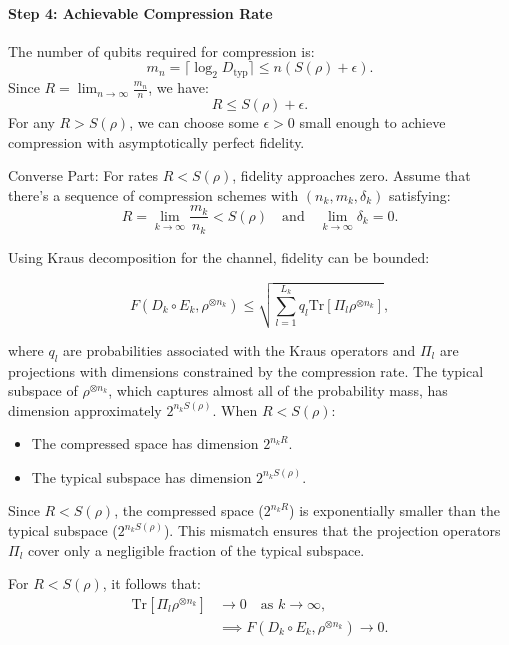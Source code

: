 \paragraph{Step 4: Achievable Compression Rate}

The number of qubits required for compression is:
\[
m_n = \lceil \log_2 D_{\text{typ}} \rceil \leq n (S(\rho) + \epsilon).
\]
Since \(R = \lim_{n \to \infty} \frac{m_n}{n}\), we have:
\[
R \leq S(\rho) + \epsilon.
\]
For any \(R > S(\rho)\), we can choose some \(\epsilon > 0\) small enough to achieve compression with asymptotically perfect fidelity.

Converse Part:
For rates \(R < S(\rho)\), fidelity approaches zero. Assume that there's a sequence of compression schemes with \((n_k, m_k, \delta_k)\) satisfying:
\[
R = \lim_{k \to \infty} \frac{m_k}{n_k} < S(\rho) \quad \text{and} \quad \lim_{k \to \infty} \delta_k = 0.
\]

\begin{flushleft}
Using Kraus decomposition for the channel, fidelity can be bounded:
\end{flushleft}
\[
F(D_k \circ E_k, \rho^{\otimes n_k}) \leq \sqrt{\sum_{l=1}^{L_k} q_l \text{Tr}[\Pi_l \rho^{\otimes n_k}]},
\]

\begin{flushleft}
where \(q_l\) are probabilities associated with the Kraus operators and \(\Pi_l\) are projections with dimensions constrained by the compression rate.
\newline
\newline
The typical subspace of \(\rho^{\otimes n_k}\), which captures almost all of the probability mass, has dimension approximately \(2^{n_k S(\rho)}\). When \(R < S(\rho)\):
\end{flushleft}

\begin{itemize}
    \item The compressed space has dimension \(2^{n_k R}\).
    \item The typical subspace has dimension \(2^{n_k S(\rho)}\).
\end{itemize}

\begin{flushleft}
Since \(R < S(\rho)\), the compressed space (\(2^{n_k R}\)) is exponentially smaller than the typical subspace (\(2^{n_k S(\rho)}\)). This mismatch ensures that the projection operators \(\Pi_l\) cover only a negligible fraction of the typical subspace.
\end{flushleft}

For \(R < S(\rho)\), it follows that:
\[
\begin{aligned}
    \text{Tr}[\Pi_l \rho^{\otimes n_k}] &\to 0 \quad \text{as } k \to \infty, \\
    &\implies F(D_k \circ E_k, \rho^{\otimes n_k}) \to 0.
\end{aligned}
\]
